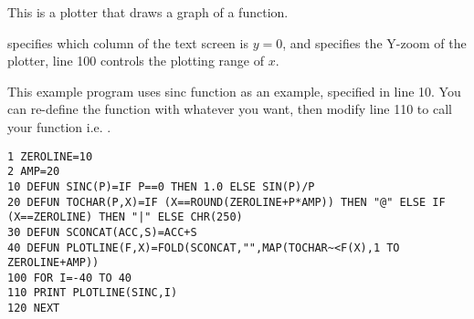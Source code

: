 This is a plotter that draws a graph of a function.

 specifies which column of the text screen is $y=0$, and  specifies the Y-zoom of the plotter, line 100 controls the plotting range of $x$.

This example program uses sinc function as an example, specified in line 10. You can re-define the function with whatever you want, then modify line 110 to call your function i.e. .

\begin{lstlisting}
1 ZEROLINE=10
2 AMP=20
10 DEFUN SINC(P)=IF P==0 THEN 1.0 ELSE SIN(P)/P
20 DEFUN TOCHAR(P,X)=IF (X==ROUND(ZEROLINE+P*AMP)) THEN "@" ELSE IF (X==ZEROLINE) THEN "|" ELSE CHR(250)
30 DEFUN SCONCAT(ACC,S)=ACC+S
40 DEFUN PLOTLINE(F,X)=FOLD(SCONCAT,"",MAP(TOCHAR~<F(X),1 TO ZEROLINE+AMP))
100 FOR I=-40 TO 40
110 PRINT PLOTLINE(SINC,I)
120 NEXT
\end{lstlisting}
